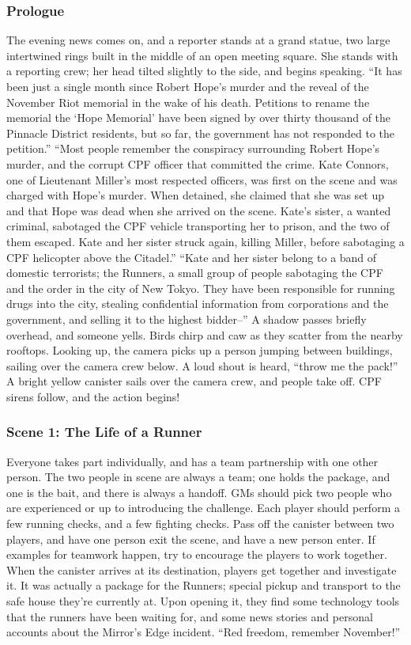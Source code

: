 \documentclass{article}
\begin{document}
\subsubsection{Prologue}
The evening news comes on, and a reporter stands at a grand statue, two large intertwined rings built in the middle of an open meeting square. She stands with a reporting crew; her head tilted slightly to the side, and begins speaking. “It has been just a single month since Robert Hope’s murder and the reveal of the November Riot memorial in the wake of his death. Petitions to rename the memorial the ‘Hope Memorial’ have been signed by over thirty thousand of the Pinnacle District residents, but so far, the government has not responded to the petition.”
“Most people remember the conspiracy surrounding Robert Hope’s murder, and the corrupt CPF officer that committed the crime. Kate Connors, one of Lieutenant Miller’s most respected officers, was first on the scene and was charged with Hope’s murder. When detained, she claimed that she was set up and that Hope was dead when she arrived on the scene. Kate’s sister, a wanted criminal, sabotaged the CPF vehicle transporting her to prison, and the two of them escaped. Kate and her sister struck again, killing Miller, before sabotaging a CPF helicopter above the Citadel.”
“Kate and her sister belong to a band of domestic terrorists; the Runners, a small group of people sabotaging the CPF and the order in the city of New Tokyo. They have been responsible for running drugs into the city, stealing confidential information from corporations and the government, and selling it to the highest bidder--”
A shadow passes briefly overhead, and someone yells. Birds chirp and caw as they scatter from the nearby rooftops. Looking up, the camera picks up a person jumping between buildings, sailing over the camera crew below. A loud shout is heard, “throw me the pack!” A bright yellow canister sails over the camera crew, and people take off. CPF sirens follow, and the action begins!
\subsubsection{Scene 1: The Life of a Runner}
Everyone takes part individually, and has a team partnership with one other person. The two people in scene are always a team; one holds the package, and one is the bait, and there is always a handoff. GMs should pick two people who are experienced or up to introducing the challenge. Each player should perform a few running checks, and a few fighting checks. Pass off the canister between two players, and have one person exit the scene, and have a new person enter. If examples for teamwork happen, try to encourage the players to work together.
When the canister arrives at its destination, players get together and investigate it. It was actually a package for the Runners; special pickup and transport to the safe house they’re currently at. Upon opening it, they find some technology tools that the runners have been waiting for, and some news stories and personal accounts about the Mirror’s Edge incident. “Red freedom, remember November!”
\end{document}
